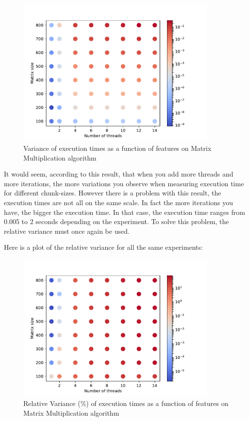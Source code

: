\documentclass[12pt]{article}
\begin{document}
\begin{figure}[H]
	\centering
	\includegraphics[width=100mm]{images/var_chunk_sizes.pdf}
	\caption{Variance of execution times as a function of features on Matrix Multiplication algorithm}
\end{figure}

 It would seem, according to this result, that when you add more threads and more iterations, the more variations you observe when measuring execution time for different chunk-sizes. However there is a problem with this result, the execution times are not all on the same scale. In fact the more iterations you have, the bigger the execution time. In that case, the execution time ranges from 0.005 to 2 seconds depending on the experiment. To solve this problem, the relative variance must once again be used. 

Here is a plot of the relative variance for all the same experiments:

\begin{figure}[H]
	\centering
	\includegraphics[width=100mm]{images/rel_var_chunk_sizes.pdf}
	\caption{Relative Variance (\%) of execution times as a function of features on Matrix Multiplication algorithm}
\end{figure}
\end{document}
